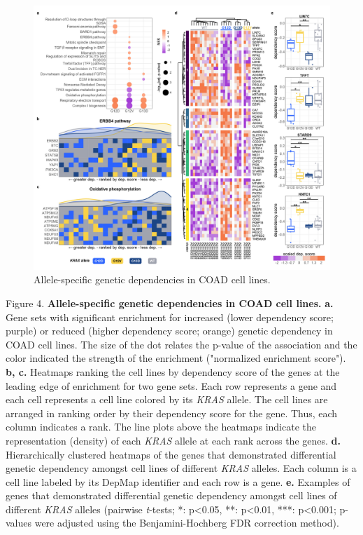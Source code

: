 \documentclass[english, 10pt, letterpaper]{article}
\newcommand{\KRAS}{\emph{KRAS}}
\begin{document}
\begin{figure}[h!]
\centering
\includegraphics[width=176mm]{figures/Fig_4_mod.jpg}
\caption{Allele-specific genetic dependencies in COAD cell lines.}
\label{fig:coad-dependency-main}
\end{figure}
\newpage
\newpage
\noindent Figure 4. \textbf{Allele-specific genetic dependencies in COAD cell lines.}
\textbf{a.} Gene sets with significant enrichment for increased (lower dependency score; purple) or reduced (higher dependency score; orange) genetic dependency in COAD cell lines. The size of the dot relates the p-value of the association and the color indicated the strength of the enrichment ("normalized enrichment score").
\textbf{b, c.} Heatmaps ranking the cell lines by dependency score of the genes at the leading edge of enrichment for two gene sets. Each row represents a gene and each cell represents a cell line colored by its \KRAS{} allele. The cell lines are arranged in ranking order by their dependency score for the gene. Thus, each column indicates a rank. The line plots above the heatmaps indicate the representation (density) of each \KRAS{} allele at each rank across the genes.
\textbf{d.} Hierarchically clustered heatmaps of the genes that demonstrated differential genetic dependency amongst cell lines of different \KRAS{} alleles. Each column is a cell line labeled by its DepMap identifier and each row is a gene.
\textbf{e.} Examples of genes that demonstrated differential genetic dependency amongst cell lines of different \KRAS{} alleles (pairwise \emph{t}-tests; *: p<0.05, **: p<0.01, ***: p<0.001; p-values were adjusted using the Benjamini-Hochberg FDR correction method).
\newpage
\end{document}
